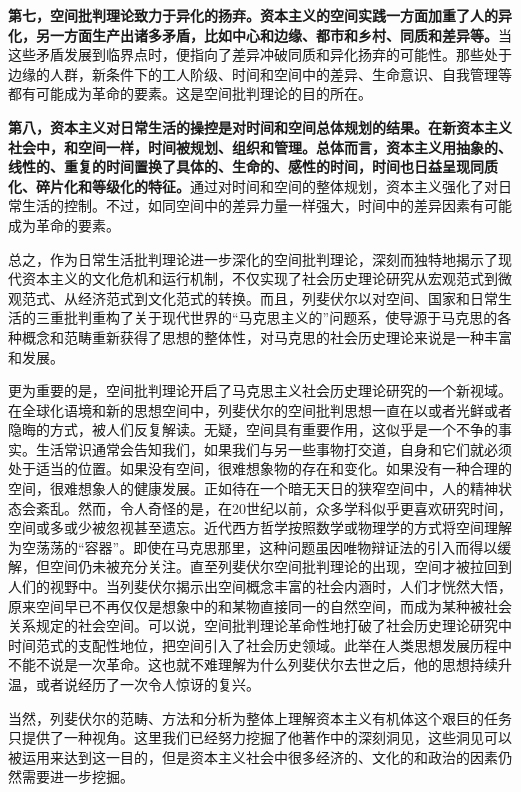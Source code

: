 \documentclass[UTF8, fontset = sourcesans, a4paper, oneside, zihao =
-4, scheme=chinese, no-math, space=true]{ctexbook}
\begin{document}
\textbf{第七，空间批判理论致力于异化的扬弃。资本主义的空间实践一方面加重了人的异化，另一方面生产出诸多矛盾，比如中心和边缘、都市和乡村、同质和差异等。}当这些矛盾发展到临界点时，便指向了差异冲破同质和异化扬弃的可能性。那些处于边缘的人群，新条件下的工人阶级、时间和空间中的差异、生命意识、自我管理等都有可能成为革命的要素。这是空间批判理论的目的所在。

\textbf{第八，资本主义对日常生活的操控是对时间和空间总体规划的结果。在新资本主义社会中，和空间一样，时间被规划、组织和管理。总体而言，资本主义用抽象的、线性的、重复的时间置换了具体的、生命的、感性的时间，时间也日益呈现同质化、碎片化和等级化的特征。}通过对时间和空间的整体规划，资本主义强化了对日常生活的控制。不过，如同空间中的差异力量一样强大，时间中的差异因素有可能成为革命的要素。

总之，作为日常生活批判理论进一步深化的空间批判理论，深刻而独特地揭示了现代资本主义的文化危机和运行机制，不仅实现了社会历史理论研究从宏观范式到微观范式、从经济范式到文化范式的转换。而且，列斐伏尔以对空间、国家和日常生活的三重批判重构了关于现代世界的``马克思主义的''问题系，使导源于马克思的各种概念和范畴重新获得了思想的整体性，对马克思的社会历史理论来说是一种丰富和发展。

更为重要的是，空间批判理论开启了马克思主义社会历史理论研究的一个新视域。在全球化语境和新的思想空间中，列斐伏尔的空间批判思想一直在以或者光鲜或者隐晦的方式，被人们反复解读。无疑，空间具有重要作用，这似乎是一个不争的事实。生活常识通常会告知我们，如果我们与另一些事物打交道，自身和它们就必须处于适当的位置。如果没有空间，很难想象物的存在和变化。如果没有一种合理的空间，很难想象人的健康发展。正如待在一个暗无天日的狭窄空间中，人的精神状态会紊乱。然而，令人奇怪的是，在20世纪以前，众多学科似乎更喜欢研究时间，空间或多或少被忽视甚至遗忘。近代西方哲学按照数学或物理学的方式将空间理解为空荡荡的``容器''。即使在马克思那里，这种问题虽因唯物辩证法的引入而得以缓解，但空间仍未被充分关注。直至列斐伏尔空间批判理论的出现，空间才被拉回到人们的视野中。当列斐伏尔揭示出空间概念丰富的社会内涵时，人们才恍然大悟，原来空间早已不再仅仅是想象中的和某物直接同一的自然空间，而成为某种被社会关系规定的社会空间。可以说，空间批判理论革命性地打破了社会历史理论研究中时间范式的支配性地位，把空间引入了社会历史领域。此举在人类思想发展历程中不能不说是一次革命。这也就不难理解为什么列斐伏尔去世之后，他的思想持续升温，或者说经历了一次令人惊讶的复兴。

当然，列斐伏尔的范畴、方法和分析为整体上理解资本主义有机体这个艰巨的任务只提供了一种视角。这里我们已经努力挖掘了他著作中的深刻洞见，这些洞见可以被运用来达到这一目的，但是资本主义社会中很多经济的、文化的和政治的因素仍然需要进一步挖掘。
\end{document}
